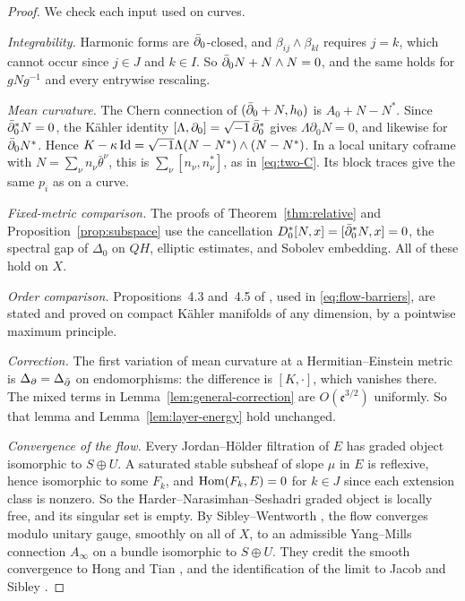 \begin{proof}
We check each input used on curves.

\emph{Integrability.} Harmonic forms are $\bar\partial_0$-closed, and
$\beta_{ij}\wedge\beta_{kl}$ requires $j=k$, which cannot occur since
$j\in J$ and $k\in I$. So $\bar\partial_0N+N\wedge N=0$, and the same holds for
$gNg^{-1}$ and every entrywise rescaling.

\emph{Mean curvature.} The Chern connection of $(\bar\partial_0+N,h_0)$ is
$A_0+N-N^*$. Since $\bar\partial_0^*N=0$, the K\"ahler identity
$[\Lambda,\partial_0]=\sqrt{-1}\,\bar\partial_0^*$ gives $\Lambda\partial_0N=0$, and
likewise for $\bar\partial_0N^*$. Hence
$K-\kappa\operatorname{Id}=\sqrt{-1}\Lambda(N-N^*)\wedge(N-N^*)$. In a local unitary
coframe with $N=\sum_\nu n_\nu\bar\theta^\nu$, this is
$\sum_\nu[n_\nu,n_\nu^*]$, as in \eqref{eq:two-C}. Its block traces give the
same $p_i$ as on a curve.

\emph{Fixed-metric comparison.} The proofs of Theorem~\ref{thm:relative}
and Proposition~\ref{prop:subspace} use the cancellation
$D_0^*[N,x]=[\bar\partial_0^*N,x]=0$, the spectral gap of $\Delta_0$ on $QH$,
elliptic estimates, and Sobolev embedding. All of these hold on $X$.

\emph{Order comparison.} Propositions~4.3 and~4.5 of \cite{HKKP2018},
used in \eqref{eq:flow-barriers}, are stated and proved on compact
K\"ahler manifolds of any dimension, by a pointwise maximum principle.

\emph{Correction.} The first variation of mean curvature at a
Hermitian--Einstein metric is $\Delta_\partial=\Delta_{\bar\partial}$ on
endomorphisms: the difference is $[K,\cdot]$, which vanishes there. The
mixed terms in Lemma~\ref{lem:general-correction} are
$O(\mathfrak e^{3/2})$ uniformly. So that lemma and Lemma~\ref{lem:layer-energy} hold
unchanged.

\emph{Convergence of the flow.} Every Jordan--H\"older filtration of $E$
has graded object isomorphic to $S\oplus U$. A saturated stable subsheaf
of slope $\mu$ in $E$ is reflexive, hence isomorphic to some $F_k$, and
$\operatorname{Hom}(F_k,E)=0$ for $k\in J$ since each extension class is nonzero. So the
Harder--Narasimhan--Seshadri graded object is locally free, and its singular
set is empty. By Sibley--Wentworth \cite[Theorem~1.1]{SibleyWentworth2015},
the flow converges modulo unitary gauge, smoothly on all of $X$, to an
admissible Yang--Mills connection $A_\infty$ on a bundle isomorphic to
$S\oplus U$. They credit the smooth convergence to Hong and Tian
\cite{HongTian2004}, and the
identification of the limit to Jacob and Sibley
\cite{Jacob2015,Sibley2015}.


\end{proof}
